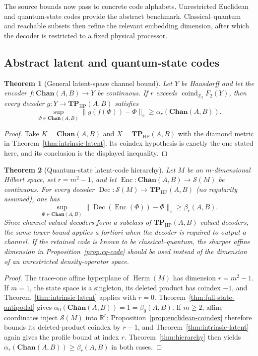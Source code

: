 \documentclass[11pt,a4paper]{article}
\theoremstyle{definition}
\theoremstyle{plain}
\newtheorem{theorem}{Theorem}[section]
\theoremstyle{remark}
\DeclareMathOperator{\Herm}{Herm}
\newcommand{\Chan}{\mathbf{Chan}}
\newcommand{\Sstate}{\mathcal{S}}
\newcommand{\TPHP}{\mathbf{TP}_{\mathrm{HP}}}
\begin{document}
The source bounds now pass to concrete code alphabets. Unrestricted
Euclidean and quantum-state codes provide the abstract benchmark.
Classical--quantum and reachable subsets then refine the relevant embedding
dimension, after which the decoder is restricted to a fixed physical
processor.

\subsection{Abstract latent and quantum-state codes}

\begin{theorem}[General latent-space channel bound]
\label{thm:general-latent}
Let $Y$ be Hausdorff and let the encoder $f:\Chan(A,B)\to Y$ be
continuous. If $r$ exceeds $\operatorname{coind}_{\mathbb Z_2}F_2(Y)$, then
every decoder $g:Y\to\TPHP(A,B)$ satisfies
\[
\sup_{\Phi\in\Chan(A,B)}
\|g(f(\Phi))-\Phi\|_\diamond
\geq\alpha_r(\Chan(A,B)).
\]
\end{theorem}

\begin{proof}
Take $K=\Chan(A,B)$ and $X=\TPHP(A,B)$ with the diamond metric in
Theorem~\ref{thm:intrinsic-latent}. Its coindex hypothesis is exactly the
one stated here, and its conclusion is the displayed inequality.
\end{proof}

\begin{theorem}[Quantum-state latent-code hierarchy]
\label{thm:compression}
Let $M$ be an $m$-dimensional Hilbert space, set $r=m^2-1$, and let
$\operatorname{Enc}:\Chan(A,B)\to\Sstate(M)$ be continuous. For every decoder $\operatorname{Dec}:\Sstate(M)\to\TPHP(A,B)$ (no regularity assumed), one has
\[
\sup_{\Phi\in\Chan(A,B)}
\|\operatorname{Dec}(\operatorname{Enc}(\Phi))-\Phi\|_\diamond
\geq\beta_r(A,B).
\]
Since channel-valued decoders form a subclass of $\TPHP(A,B)$-valued
decoders, the same lower bound applies a fortiori when the decoder is
required to output a channel. If the retained code is known to be
classical--quantum, the sharper affine dimension in
Proposition~\ref{prop:cq-code} should be used instead of the dimension of an
unrestricted density-operator space.
\end{theorem}

\begin{proof}
The trace-one affine hyperplane of $\Herm(M)$ has dimension $r=m^2-1$.
If $m=1$, the state space is a singleton, its deleted product has coindex
$-1$, and Theorem~\ref{thm:intrinsic-latent} applies with $r=0$.
Theorem~\ref{thm:full-state-antipodal} gives
$\alpha_0(\Chan(A,B))=1=\beta_0(A,B)$. If
$m\geq2$, affine coordinates inject $\Sstate(M)$ into $\mathbb R^r$;
Proposition~\ref{prop:euclidean-coindex} therefore bounds its deleted-product
coindex by $r-1$, and Theorem~\ref{thm:intrinsic-latent} again gives the
profile bound at index $r$. Theorem~\ref{thm:hierarchy} then yields
$\alpha_r(\Chan(A,B))\geq\beta_r(A,B)$ in both cases.
\end{proof}
\end{document}
